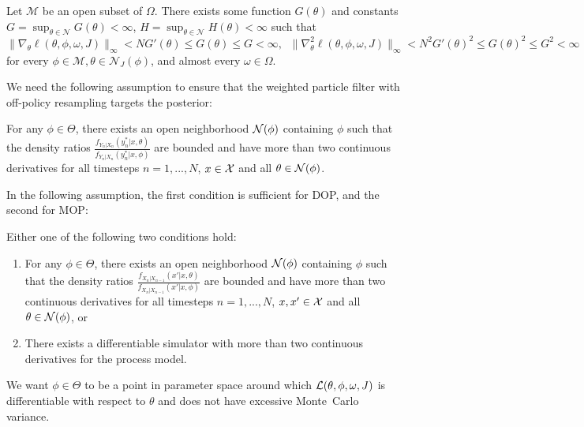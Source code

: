 \documentclass{article}
\begin{document}
\begin{aspt}
\label{assump:local-bounded-derivative}
Let $\mathcal{M}$ be an open subset of $\Omega$. There exists some function $G(\theta)$ and constants $G=\sup _{\theta \in \mathcal{N}} G(\theta)<\infty$, $H=\sup _{\theta \in \mathcal{N}} H(\theta)<\infty$ such that
    $$
    \|\nabla_\theta \ell(\theta, \phi, \omega, J)\|_\infty < NG'(\theta) \leq G(\theta) \leq G<\infty, \;\;
    \|\nabla^2_\theta \ell(\theta, \phi, \omega, J)\|_\infty <N^2G'(\theta)^2 \leq G(\theta)^2 \leq G^2<\infty
    $$
    for every $\phi \in \mathcal{M}, \theta \in \mathcal{N}_J(\phi)$, and almost every $\omega \in \Omega$.
\end{aspt}


We need the following assumption to ensure that the weighted particle filter with off-policy resampling targets the posterior:
\begin{aspt}
    \label{assump:diff-meas}
    For any $\phi \in \Theta$, there exists an open neighborhood ${\mathcal{N}}(\phi)$ containing $\phi$ such that the density ratios $\frac{f_{Y_n|X_n}(y_n^*|x, \theta)}{f_{Y_n|X_n}(y_n^*|x, \phi)}$ are bounded and have more than two continuous derivatives for all timesteps $n=1,...,N$, $x \in {\mathcal{X}}$ and all $\theta\in{\mathcal{N}}(\phi)$. 
\end{aspt}

In the following assumption, the first condition is sufficient for DOP, and the second for MOP:
\begin{aspt}
    \label{assump:diff-process}
    Either one of the following two conditions hold:
    \begin{enumerate}
        \item For any $\phi \in \Theta$, there exists an open neighborhood ${\mathcal{N}}(\phi)$ containing $\phi$ such that the density ratios $\frac{f_{X_n|X_{n-1}}(x'|x, \theta)}{f_{X_n|X_{n-1}}(x'|x, \phi)}$ are bounded and have more than two continuous derivatives for all timesteps $n=1,...,N$, $x, x' \in {\mathcal{X}}$ and all $\theta\in{\mathcal{N}}(\phi)$, or
        \item There exists a differentiable simulator with more than two continuous derivatives for the process model. 
    \end{enumerate}
\end{aspt}

We want $\phi\in\Theta$ to be a point in parameter space around which $\mathcal{L}(\theta,\phi,\omega, J)$ is differentiable with respect to $\theta$ and does not have excessive Monte~Carlo variance.
\end{document}
